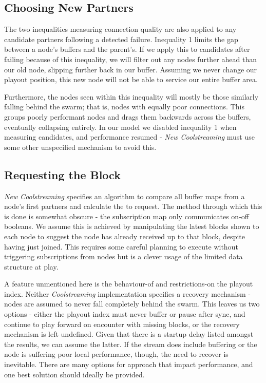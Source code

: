 \documentclass[12pt,a4paper]{article}
\begin{document}
\subsection{Choosing New Partners} \label{problems:newpartners}
The two inequalities measuring connection quality are also applied to any candidate partners following a detected failure. Inequality 1 limits the gap between a node's  buffers and the parent's. If we apply this to candidates after failing because of this inequality, we will filter out any nodes further ahead than our old node, slipping further back in our buffer. Assuming we never change our playout position, this new node will not be able to service our entire buffer area.

Furthermore, the nodes seen within this inequality will mostly be those similarly falling behind the swarm; that is, nodes with equally poor connections. This groups poorly performant nodes and drags them backwards across the buffers, eventually collapsing entirely. In our model we disabled inequality 1 when measuring candidates, and performance resumed - \textit{New Coolstreaming} must use some other unspecified mechanism to avoid this.

\subsection{Requesting the Block} \label{problems:requesting}
\textit{New Coolstreaming} specifies an algorithm to compare all buffer maps from a node's first partners and calculate the  to request. The method through which this is done is somewhat obscure - the subscription map only communicates on-off booleans. We assume this is achieved by manipulating the latest blocks shown to each node to suggest the node has already received up to that block, despite having just joined. This requires some careful planning to execute without triggering subscriptions from nodes but is a clever usage of the limited data structure at play.

A feature unmentioned here is the behaviour-of and restrictions-on the playout index. Neither \textit{Coolstreaming} implementation specifies a recovery mechanism - nodes are assumed to never fall completely behind the swarm. This leaves us two options - either the playout index must never buffer or pause after sync, and continue to play forward on encounter with missing blocks, or the recovery mechanism is left undefined. Given that there is a startup delay listed amongst the results, we can assume the latter. If the stream does include buffering or the node is suffering poor local performance, though, the need to recover is inevitable. There are many options for approach that impact performance, and one best solution should ideally be provided.
\end{document}
